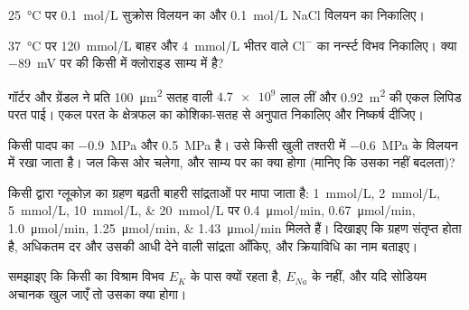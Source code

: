 \begin{exercise}[$\star$]\label{exo:b1:membranes-transport:3}
\qty{25}{\celsius} पर \qty{0.1}{mol/L} सुक्रोस विलयन का और
\qty{0.1}{mol/L} NaCl विलयन का  निकालिए।
\end{exercise}

\begin{exercise}[$\star$]\label{exo:b1:membranes-transport:4}
\qty{37}{\celsius} पर \qty{120}{mmol/L} बाहर और \qty{4}{mmol/L} भीतर
वाले $\mathrm{Cl^-}$ का नर्न्स्ट विभव निकालिए। क्या \qty{-89}{mV} पर की
किसी  में क्लोराइड साम्य में है?
\end{exercise}

\begin{exercise}[$\star\star$]\label{exo:b1:membranes-transport:5}
गॉर्टर और ग्रेंडल ने प्रति  \qty{100}{\micro m^2} सतह वाली
$\num{4.7e9}$ लाल  लीं और \qty{0.92}{m^2} की एकल लिपिड परत पाई।
एकल परत के क्षेत्रफल का कोशिका-सतह से अनुपात निकालिए और निष्कर्ष
दीजिए।
\end{exercise}

\begin{exercise}[$\star\star$]\label{exo:b1:membranes-transport:6}
किसी पादप  का  \qty{-0.9}{MPa} और 
\qty{0.5}{MPa} है। उसे किसी खुली तश्तरी में \qty{-0.6}{MPa} 
के विलयन में रखा जाता है। जल किस ओर चलेगा, और साम्य पर  का  क्या होगा (मानिए कि उसका  नहीं बदलता)?
\end{exercise}

\begin{exercise}[$\star\star$]\label{exo:b1:membranes-transport:7}
किसी  द्वारा ग्लूकोज़ का ग्रहण बढ़ती बाहरी सांद्रताओं पर मापा
जाता है: \qtylist{1;2;5;10;20}{mmol/L} पर
\qtylist{0.4;0.67;1.0;1.25;1.43}{\micro mol/min} मिलते हैं। दिखाइए कि
ग्रहण संतृप्त होता है, अधिकतम दर और उसकी आधी देने वाली सांद्रता आँकिए,
और क्रियाविधि का नाम बताइए।
\end{exercise}

\begin{exercise}[$\star\star$]\label{exo:b1:membranes-transport:8}
समझाइए कि किसी  का विश्राम विभव $E_K$ के पास क्यों रहता है,
$E_{Na}$ के नहीं, और यदि सोडियम  अचानक खुल जाएँ तो उसका क्या होगा।
\end{exercise}

